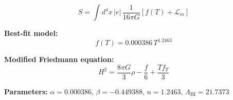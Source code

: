
\begin{equation}
  S = \int d^4x \, |e| \, \frac{1}{16\pi G} \left[ f(T) + \mathcal{L}_m \right]
\end{equation}

\textbf{Best-fit model:}
\begin{equation}
  f(T) = 0.000386 \, T^{1.2463}
\end{equation}

\textbf{Modified Friedmann equation:}
\begin{equation}
  H^2 = \frac{8\pi G}{3} \rho - \frac{f}{6} + \frac{T f_T}{3}
\end{equation}

\textbf{Parameters:}
$\alpha = 0.000386$, \quad
$\beta = -0.449388$, \quad
$n = 1.2463$, \quad
$\Lambda_{\text{BI}} = 21.7373$